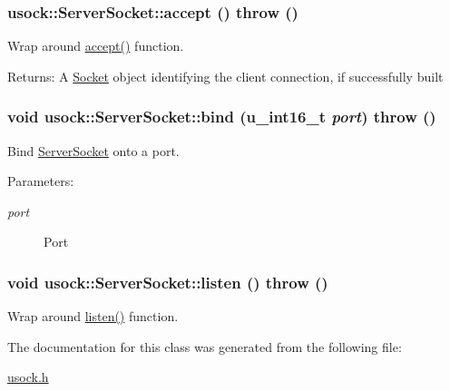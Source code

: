 \hypertarget{classusock_1_1ServerSocket_bf0477af52a725ced6afad86d7b3e794}{
\subsubsection[{accept}]{ usock::ServerSocket::accept ()  throw ()}}
\label{classusock_1_1ServerSocket_bf0477af52a725ced6afad86d7b3e794}


Wrap around \hyperlink{classusock_1_1ServerSocket_bf0477af52a725ced6afad86d7b3e794}{accept()} function. 

\begin{Desc}
\item[Returns:]A \hyperlink{classusock_1_1Socket}{Socket} object identifying the client connection, if successfully built \end{Desc}
\hypertarget{classusock_1_1ServerSocket_9ecf37cae8379df6eaf366ab88df244a}{
\subsubsection[{bind}]{\setlength{\rightskip}{0pt plus 5cm}void usock::ServerSocket::bind (u\_\-int16\_\-t {\em port})  throw ()}}
\label{classusock_1_1ServerSocket_9ecf37cae8379df6eaf366ab88df244a}


Bind \hyperlink{classusock_1_1ServerSocket}{ServerSocket} onto a port. 

\begin{Desc}
\item[Parameters:]
\begin{description}
\item[{\em port}]Port \end{description}
\end{Desc}
\hypertarget{classusock_1_1ServerSocket_c6cd2070380b84275c5f69265c57713b}{
\subsubsection[{listen}]{\setlength{\rightskip}{0pt plus 5cm}void usock::ServerSocket::listen ()  throw ()}}
\label{classusock_1_1ServerSocket_c6cd2070380b84275c5f69265c57713b}


Wrap around \hyperlink{classusock_1_1ServerSocket_c6cd2070380b84275c5f69265c57713b}{listen()} function. 



The documentation for this class was generated from the following file:\begin{CompactItemize}
\item 
\hyperlink{usock_8h}{usock.h}\end{CompactItemize}
